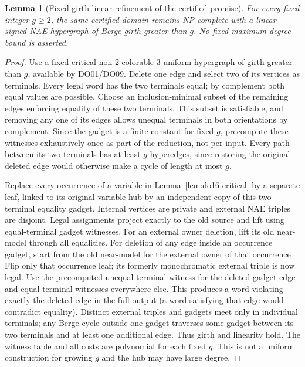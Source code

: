 \documentclass[11pt]{article}
\newtheorem{lemma}[theorem]{Lemma}
\begin{document}
\begin{lemma}[Fixed-girth linear refinement of the certified promise]\label{lem:do16-girth}
For every fixed integer $g\ge2$, the same certified domain remains NP-complete with a linear signed NAE hypergraph of Berge girth greater than $g$. No fixed maximum-degree bound is asserted.
\end{lemma}
\begin{proof}
Use a fixed critical non-2-colorable 3-uniform hypergraph of girth greater than $g$, available by DO01/DO09. Delete one edge and select two of its vertices as terminals. Every legal word has the two terminals equal; by complement both equal values are possible. Choose an inclusion-minimal subset of the remaining edges enforcing equality of these two terminals. This subset is satisfiable, and removing any one of its edges allows unequal terminals in both orientations by complement. Since the gadget is a finite constant for fixed $g$, precompute these witnesses exhaustively once as part of the reduction, not per input. Every path between its two terminals has at least $g$ hyperedges, since restoring the original deleted edge would otherwise make a cycle of length at most $g$.

Replace every occurrence of a variable in Lemma~\ref{lem:do16-critical} by a separate leaf, linked to its original variable hub by an independent copy of this two-terminal equality gadget. Internal vertices are private and external NAE triples are disjoint. Legal assignments project exactly to the old source and lift using equal-terminal gadget witnesses. For an external owner deletion, lift its old near-model through all equalities. For deletion of any edge inside an occurrence gadget, start from the old near-model for the external owner of that occurrence. Flip only that occurrence leaf; its formerly monochromatic external triple is now legal. Use the precomputed unequal-terminal witness for the deleted gadget edge and equal-terminal witnesses everywhere else. This produces a word violating exactly the deleted edge in the full output (a word satisfying that edge would contradict equality). Distinct external triples and gadgets meet only in individual terminals; any Berge cycle outside one gadget traverses some gadget between its two terminals and at least one additional edge. Thus girth and linearity hold. The witness table and all costs are polynomial for each fixed $g$. This is not a uniform construction for growing $g$ and the hub may have large degree.
\end{proof}
\end{document}
